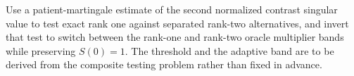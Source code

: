 Use a patient-martingale estimate of the second normalized contrast singular value to test exact rank one against separated rank-two alternatives, and invert that test to switch between the rank-one and rank-two oracle multiplier bands while preserving \(S(0)=1\). The threshold and the adaptive band are to be derived from the composite testing problem rather than fixed in advance.